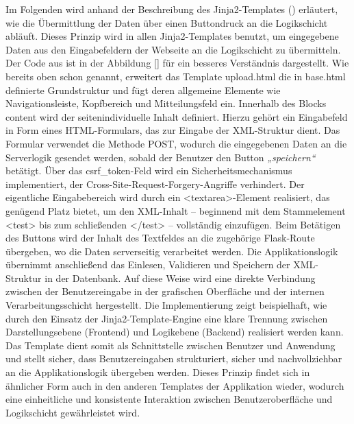 Im Folgenden wird anhand der Beschreibung des Jinja2-Templates () erläutert, wie die Übermittlung der Daten über einen Buttondruck an die Logikschicht abläuft.
Dieses Prinzip wird in allen Jinja2-Templates benutzt, um eingegebene Daten aus den Eingabefeldern der Webseite an die Logikschicht zu übermitteln.
Der Code aus  ist in der Abbildung \ref{} für ein besseres Verständnis dargestellt.
Wie bereits oben schon genannt, erweitert das Template upload.html die in base.html definierte Grundstruktur und fügt deren allgemeine Elemente wie Navigationsleiste, Kopfbereich und Mitteilungsfeld ein.
Innerhalb des Blocks content wird der seitenindividuelle Inhalt definiert.
Hierzu gehört ein Eingabefeld in Form eines HTML-Formulars, das zur Eingabe der XML-Struktur dient.
Das Formular verwendet die Methode POST, wodurch die eingegebenen Daten an die Serverlogik gesendet werden, sobald der Benutzer den Button \textit{„speichern“} betätigt.
Über das csrf\_token-Feld wird ein Sicherheitsmechanismus implementiert, der Cross-Site-Request-Forgery-Angriffe verhindert.
Der eigentliche Eingabebereich wird durch ein <textarea>-Element realisiert, das genügend Platz bietet, um den XML-Inhalt – beginnend mit dem Stammelement <test> bis zum schließenden </test> – vollständig einzufügen.
Beim Betätigen des Buttons wird der Inhalt des Textfeldes an die zugehörige Flask-Route übergeben, wo die Daten serverseitig verarbeitet werden.
Die Applikationslogik übernimmt anschließend das Einlesen, Validieren und Speichern der XML-Struktur in der Datenbank.
Auf diese Weise wird eine direkte Verbindung zwischen der Benutzereingabe in der grafischen Oberfläche und der internen Verarbeitungsschicht hergestellt.
Die Implementierung zeigt beispielhaft, wie durch den Einsatz der Jinja2-Template-Engine eine klare Trennung zwischen Darstellungsebene (Frontend) und Logikebene (Backend) realisiert werden kann.
Das Template dient somit als Schnittstelle zwischen Benutzer und Anwendung und stellt sicher, dass Benutzereingaben strukturiert, sicher und nachvollziehbar an die Applikationslogik übergeben werden.
Dieses Prinzip findet sich in ähnlicher Form auch in den anderen Templates der Applikation wieder, wodurch eine einheitliche und konsistente Interaktion zwischen Benutzeroberfläche und Logikschicht gewährleistet wird.





